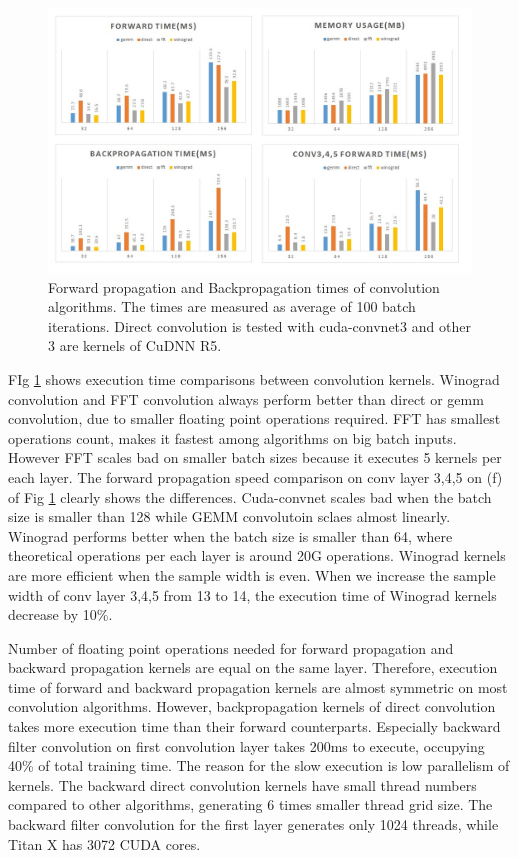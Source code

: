 \documentclass[conference]{IEEEtran}
\begin{document}
\begin{figure}
  \centering
  \includegraphics[width=\linewidth]{./figures/conv_time}
  \caption{Forward propagation and Backpropagation times of convolution algorithms. The times are measured as average of 100 batch iterations. 
Direct convolution is tested with cuda-convnet3 and other 3 are kernels of CuDNN R5. }
  \label{fig_conv_time}
\end{figure}

FIg \ref{fig_conv_time} shows execution time comparisons between convolution kernels.
Winograd convolution and FFT convolution always perform better than direct or gemm convolution, due to smaller floating point operations required.
FFT has smallest operations count, makes it fastest among algorithms on big batch inputs.
However FFT scales bad on smaller batch sizes because it executes 5 kernels per each layer.
The forward propagation speed comparison on conv layer 3,4,5 on (f) of Fig \ref{fig_conv_time} clearly shows the differences.
Cuda-convnet scales bad when the batch size is smaller than 128 while GEMM convolutoin sclaes almost linearly.
Winograd performs better when the batch size is smaller than 64, where theoretical operations per each layer is around 20G operations.
Winograd kernels are more efficient when the sample width is even.
When we increase the sample width of conv layer 3,4,5 from 13 to 14, the execution time of Winograd kernels decrease by 10\%.

Number of floating point operations needed for forward propagation and backward propagation kernels are equal on the same layer.
Therefore, execution time of forward and backward propagation kernels are almost symmetric on most convolution algorithms.
However, backpropagation kernels of direct convolution takes more execution time than their forward counterparts.
Especially backward filter convolution on first convolution layer takes 200ms to execute, occupying 40\% of total training time.
The reason for the slow execution is low parallelism of kernels.
The backward direct convolution kernels have small thread numbers compared to other algorithms, generating 6 times smaller thread grid size.
The backward filter convolution for the first layer generates only 1024 threads, while Titan X has 3072 CUDA cores.
\end{document}
